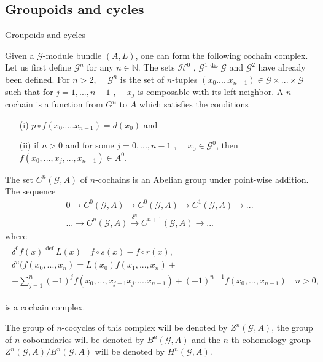 \documentclass{beamer}
\theoremstyle{plain}
\newcommand{\G}{\mathcal{G}}
\newcommand{\N}{\mathbb{N}}                  %
\renewcommand{\H}{\mathcal{H}}               %
\newcommand{\bean}{\begin{eqnarray*}}
\newcommand{\eean}{\end{eqnarray*}}
\newcommand{\bydef}{\stackrel{\mathrm{def}}{=}}
\begin{document}
\subsection{Groupoids and cycles}
\begin{frame}
		\begin{center}
\huge Groupoids and cycles 
	\end{center}
	
	
	Given a $\G$-module bundle $( A , L )$, one can form the following cochain complex. Let
	us first define $\G^n$ for any $n\in\N$. The sets $\H^0$ , $\G^1\bydef \G$ and $\G^2$ have already been defined. For $n> 2$, $\quad \G^n$ is the set of $n$-tuples $(x_0 . . . . . x_{n-1}) \in \G\times...\times \G$ such that for $
	j = 1 , . . . , n - 1$ , $\quad x_j$ is composable with its left  neighbor. A $n$-cochain is a function from $G^n$ to $A$ which satisfies the conditions
	\begin{enumerate}
		\item[(i)] $p\circ f(x_0 . . . . . x_{n-1}) = d(x_0)$ and
		\item[(ii)] if $n > 0$ and for some $j = 0, . . . , n - 1$ , $\quad x_0 \in \G^0$, then $f ( x_0, ..., x_j , ..., x_{n-1})\in A^0$.
	\end{enumerate}
	\end{frame}
	\begin{frame}
	The set $C^n\left(\G, A\right)$ of $n$-cochains is an Abelian group under point-wise addition. The
	sequence 
	\bean
	0 \to C^0\left( \G, A\right)\to C^0\left( \G, A\right)\to C^1\left( \G, A\right)\to...\\...\to  C^n\left( \G, A\right) \xrightarrow{\delta^n} C^{n + 1}\left( \G, A\right)\to ...
	\eean
	where 
	\bean
	\begin{split}
		\delta^0f(x)\bydef L(x)\quad  f\circ s(x) - f \circ r ( x ),\\
		\delta^n(f(x_0 ,..., x_n) = L ( x_0 ) f ( x_1,..., x_n) +\\+ \sum_{j=1}^n (-1)^j
		f ( x_0 ,..., x_{j-1}x_j . . . . . x_{n-1})+(-1)^{n-1} f ( x_0 , . . . , x_{n-1}) \quad  n > 0,
	\end{split}
	\eean
	
	is a cochain complex.
	
\begin{definition}\label{groupoid_cocycle_defn}
	The group of $n$-cocycles of this complex will be denoted by $Z^n(\G,A)$,
	the group of $n$-coboundaries will be denoted by $B^n(\G,A)$ and the $n$-th cohomology group
	$Z^n(\G,A)/B^n(\G,A)$ will be denoted by $H^n(\G,A)$.
\end{definition}
\end{frame}
\end{document}
